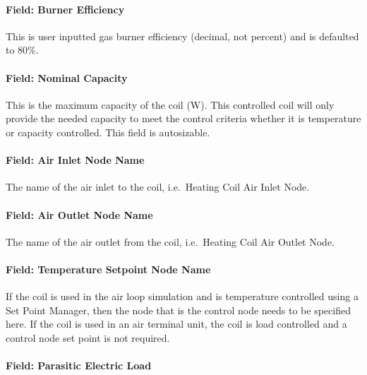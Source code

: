 \paragraph{Field: Burner Efficiency}\label{field-gas-burner-efficiency}

This is user inputted gas burner efficiency (decimal, not percent) and is defaulted to 80\%.

\paragraph{Field: Nominal Capacity}\label{field-nominal-capacity-1-000}

This is the maximum capacity of the coil (W). This controlled coil will only provide the needed capacity to meet the control criteria whether it is temperature or capacity controlled. This field is autosizable.

\paragraph{Field: Air Inlet Node Name}\label{field-air-inlet-node-name-6}

The name of the air inlet to the coil, i.e.~Heating Coil Air Inlet Node.

\paragraph{Field: Air Outlet Node Name}\label{field-air-outlet-node-name-6-000}

The name of the air outlet from the coil, i.e.~Heating Coil Air Outlet Node.

\paragraph{Field: Temperature Setpoint Node Name}\label{field-temperature-setpoint-node-name-4}

If the coil is used in the air loop simulation and is temperature controlled using a Set Point Manager, then the node that is the control node needs to be specified here. If the coil is used in an air terminal unit, the coil is load controlled and a control node set point is not required.

\paragraph{Field: Parasitic Electric Load}\label{field-parasitic-electric-load-1}

